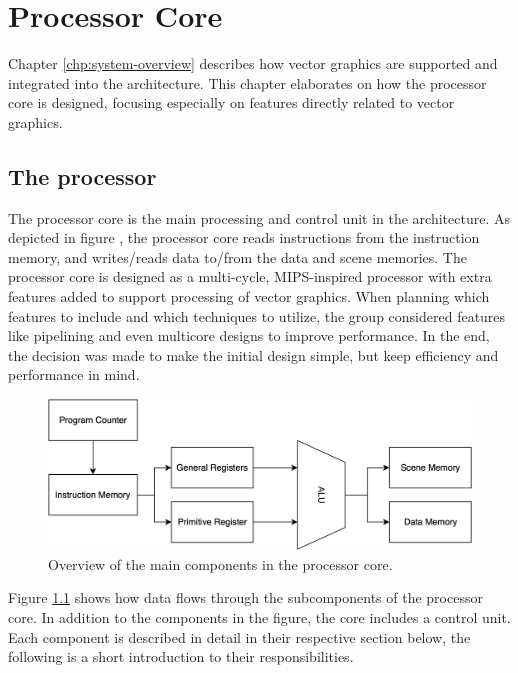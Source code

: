 \chapter{Processor Core}

Chapter \ref{chp:system-overview} describes how vector graphics are supported and integrated into the \vthreek architecture.
This chapter elaborates on how the processor core is designed, focusing especially on features directly related to vector graphics.

\section{The \vthreek processor}

The processor core is the main processing and control unit in the \vthreek architecture.
As depicted in figure \label{fig:system-overview}, the processor core reads instructions from the instruction memory, and writes/reads data to/from the data and scene memories.
The processor core is designed as a multi-cycle, MIPS-inspired processor with extra features added to support processing of vector graphics.
When planning which features to include and which techniques to utilize, the group considered features like pipelining and even multicore designs to improve performance.
In the end, the decision was made to make the initial design simple, but keep efficiency and performance in mind.

\begin{figure}[H]
    \includegraphics[width=\linewidth]{images/core-components.png}
    \caption{Overview of the main components in the processor core.}
    \label{fig:core-components}
\end{figure}

Figure \ref{fig:core-components} shows how data flows through the subcomponents of the processor core.
In addition to the components in the figure, the core includes a control unit.
Each component is described in detail in their respective section below, the following is a short introduction to their responsibilities.

